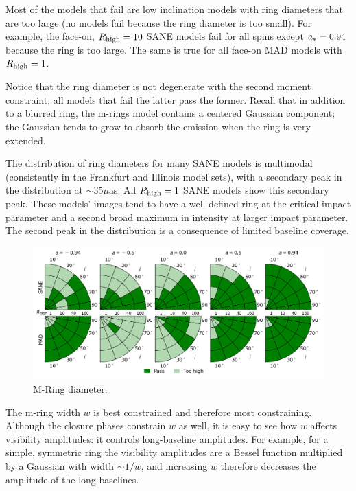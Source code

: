 Most of the models that fail are low inclination models with ring diameters that are too large (no models fail because the ring diameter is too small).  For example, the face-on, $R_\mathrm{high} = 10$ SANE models fail for all spins except $a_* = 0.94$ because the ring is too large.  The same is true for all face-on MAD models with $R_\mathrm{high} = 1$.

Notice that the ring diameter is not degenerate with the second moment constraint; all models that fail the latter pass the former.  Recall that in addition to a blurred ring, the m-rings model contains a centered Gaussian component; the Gaussian tends to grow to absorb the emission when the ring is very extended.   

The distribution of ring diameters for many SANE models is multimodal (consistently in the Frankfurt and Illinois model sets), with a secondary peak in the distribution at $\sim 35\mu$as.  All $R_\mathrm{high} = 1$ SANE models show this secondary peak.  These models' images tend to have a well defined ring at the critical impact parameter and a second broad maximum in intensity at larger impact parameter.  The second peak in the distribution is a consequence of limited baseline coverage.

\begin{figure}
  \centering
  \includegraphics[width=\textwidth]{./figures/Mring_d_Constraints.png}
  \caption{M-Ring diameter.}
  \label{fig:cmp_m-ring_diam}
\end{figure}

The m-ring width $w$ is best constrained and therefore most constraining.  Although the closure phases constrain $w$ as well, it is easy to see how $w$ affects visibility amplitudes: it controls long-baseline amplitudes.  For example, for a simple, symmetric ring the visibility amplitudes are a Bessel function multiplied by a Gaussian with width $\sim 1/w$, and increasing $w$ therefore decreases the amplitude of the long baselines.   

